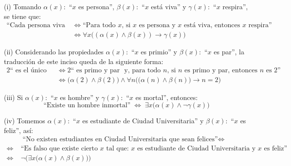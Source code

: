 \documentclass[letterpaper,DIV=14,headsepline,12pt]{scrartcl}
\makeatletter
\newenvironment{solu}[1][]{%
        \par\pushQED{\hfill \lozenge}%
        \normalfont\topsep6pt \partopsep0pt %
        \trivlist
        \item[\hskip\labelsep
                \textbf{\textit{Solución.}}%
        ]#1
        }{%
        \popQED\endtrivlist\@endpefalse
    }
\makeatother
\begin{document}
    \begin{solu}
        (i) Tomando $\alpha(x):$ ``$x$ es persona'', $\beta(x):$ ``$x$ está viva'' y $\gamma(x):$ ``$x$ respira'', se tiene que:
        \begin{align*}
            \text{``Cada persona viva respira''} & \Leftrightarrow \text{``Para todo } x \text{, si } x \text{ es persona y } x \text{ está viva, entonces } x \text{ respira''} \\
            & \Leftrightarrow \forall x \big( (\alpha(x) \land \beta(x)) \rightarrow \gamma(x) \big)
        \end{align*}

        (ii) Considerando las propiedades $\alpha(x):$ ``$x$ es primio'' y $\beta(x):$ ``$x$ es par'', la traducción de este inciso queda de la siguiente forma:
        \begin{align*}
            2 \text{`` es el único primo par.''} & \Leftrightarrow 2 \text{`` es primo y par } \text{ y, para todo } n \text{, si } n \text{ es primo y par, entonces } n \text{ es 2''} \\
            & \Leftrightarrow \big( \alpha(2) \land \beta(2) \big) \land \forall n \Big( \big( \alpha(n) \land \beta(n) \big) \to n=2 \Big)
        \end{align*}

        (iii) Si $\alpha(x):$ ``$x$ es hombre'' y $\gamma(x):$ ``$x$ es mortal'', entonces:
        \[ \text{``Existe un hombre inmortal''} \; \Leftrightarrow \; \exists x \big( \alpha(x) \land \lnot \gamma(x) \big) \]

        (iv) Tomemos $\alpha(x):$ ``$x$ es estudiante de Ciudad Universitaria'' y $\beta(x):$ ``$x$ es feliz'', así:
        \begin{align*}
            & \; \text{``No existen estudiantes en Ciudad Universitaria que sean felices''} \Leftrightarrow \\
            \Leftrightarrow \; & \text{``Es falso que existe cierto } x \text{ tal que: } x \text{ es estudiante de Ciudad Universitaria y } x \text{ es feliz''} \\
            \Leftrightarrow \; & \lnot \Big( \exists x \big( \alpha(x) \land \beta(x) \big) \Big)
        \end{align*}


\end{solu}
\end{document}
